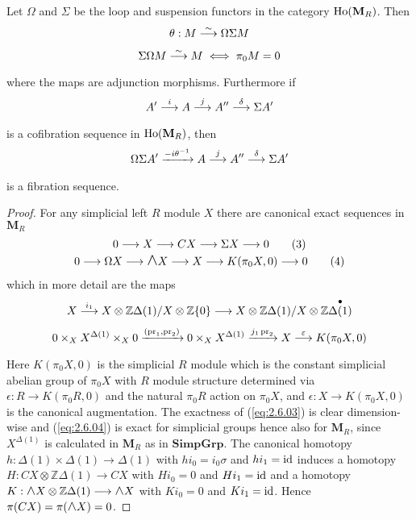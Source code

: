 \documentclass[../main]{subfiles}
\begin{document}
\begin{proposition}
\label{pro:2.6.01}
Let $\Omega$ and $\Sigma$ be the loop and suspension functors in the category $\operatorname{Ho}(\mathbf{M}_R)$. Then 
\begin{gather*}
    \theta:M\varrightarrow{\sim}\Omega\Sigma M\\
    \Sigma\Omega M\varrightarrow{\sim}M\iff \pi_0 M=0
\end{gather*}
where the maps are adjunction morphisms. Furthermore if \[A'\varrightarrow{i}A\varrightarrow{j}A''\varrightarrow{\delta}\Sigma A'\]is a cofibration sequence in $\operatorname{Ho}(\mathbf{M}_R)$, then \[\Omega\Sigma A'\varrightarrow{-i\theta^{-1}}A\varrightarrow{j}A''\varrightarrow{\delta}\Sigma A'\]is a fibration sequence.
\end{proposition}
\begin{proof}
For any simplicial left $R$ module $X$ there are canonical exact sequences in $\mathbf{M}_R$
\begin{gather}
    0\longrightarrow X\longrightarrow CX\longrightarrow \Sigma X\longrightarrow 0\label{eq:2.6.03}\tag{3}\\
    0\longrightarrow\Omega X\longrightarrow\mathlarger{\mathlarger{\wedge}}X\longrightarrow X\longrightarrow K(\pi_0 X,0)\longrightarrow 0\label{eq:2.6.04}\tag{4}
\end{gather}
which in more detail are the maps
\begin{gather*}
    X\varrightarrow{i_1} X\otimes\mathbb{Z}\Delta(1)/X\otimes\mathbb{Z}\{0\}\longrightarrow X\otimes\mathbb{Z}\Delta(1)/X\otimes\mathbb{Z}\overset{\bullet}{\Delta(1)}\\
    0\times_{X}X^{\Delta(1)}\times_{X}0\varrightarrow{(\pr_1,\pr_2)}0\times_{X}X^{\Delta(1)}\varrightarrow{j_1\pr_2}X\varrightarrow{\epsilon}K(\pi_0 X,0)
\end{gather*}
Here $K(\pi_0 X,0)$ is the simplicial $R$ module which is the constant simplicial abelian group of $\pi_0 X$ with $R$ module structure determined via $\epsilon: R\longrightarrow K(\pi_0 R,0)$ and the natural $\pi_0 R$ action on $\pi_0 X$, and $\epsilon:X\longrightarrow K(\pi_0 X,0)$ is the canonical augmentation. The exactness of (\ref{eq:2.6.03}) is clear dimension-wise and (\ref{eq:2.6.04}) is exact for simplicial groups hence also for $\mathbf{M}_R$, since $X^{\Delta(1)}$ is calculated in $\mathbf{M}_R$ as in $\mathbf{SimpGrp}$. The canonical homotopy $h:\Delta(1)\times\Delta(1)\longrightarrow\Delta(1)$ with $hi_0=i_0\sigma$ and $hi_{1}=\operatorname{id} $ induces a homotopy $H:CX\otimes\mathbb{Z}\Delta(1)\longrightarrow CX$ with $Hi_0=0$ and $Hi_1=\operatorname{id} $ and a homotopy $K:\mathlarger{\mathlarger{\wedge}}X\otimes\mathbb{Z}\Delta(1)\longrightarrow\mathlarger{\mathlarger{\wedge}}X$ with $Ki_0=0$ and $Ki_1=\operatorname{id} $. Hence $\pi(CX)=\pi(\mathlarger{\mathlarger{\wedge}}X)=0$.


\end{proof}
\end{document}
